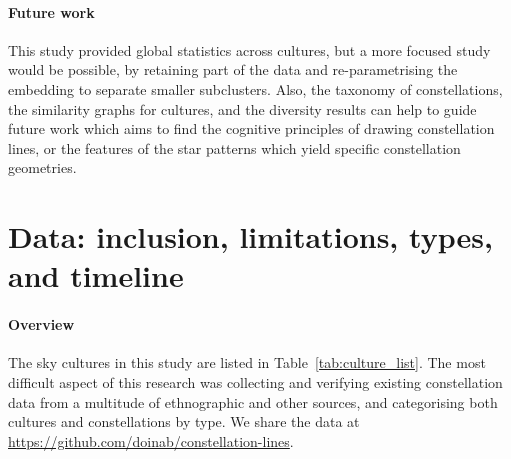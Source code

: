 \documentclass[10pt]{article}
\begin{document}
\paragraph{Future work} This study provided global statistics across cultures, but a more focused study would be possible, by retaining part of the data and re-parametrising the embedding to separate smaller subclusters. Also, the taxonomy of constellations, the similarity graphs for cultures, and the diversity results can help to guide future work which aims to find the cognitive principles of drawing constellation lines, or the features of the star patterns which yield specific constellation geometries.


\section{Data: inclusion, limitations, types, and timeline}
\label{sec:data}

\paragraph{Overview} The sky cultures in this study are listed in Table~\ref{tab:culture_list}. The most difficult aspect of this research was collecting and verifying existing constellation data from a multitude of ethnographic and other sources, and categorising both cultures and constellations by type. We share the data at \url{https://github.com/doinab/constellation-lines}.
\end{document}
